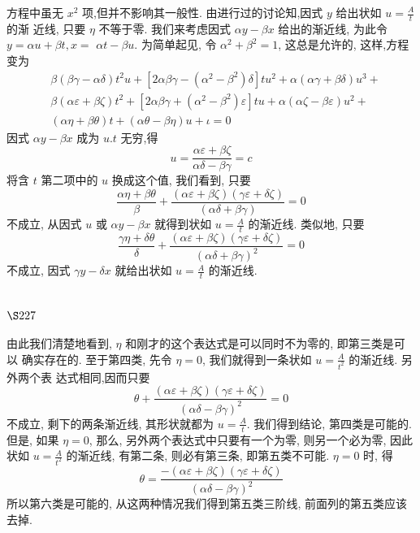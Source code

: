 方程中虽无 $x^{2}$ 项,但并不影响其一般性. 由进行过的讨论知,因式 $y$ 给出状如 $u=\frac{A}{t}$ 的渐 近线, 只要 $\eta$ 不等于零. 我们来考虑因式 $\alpha y-\beta x$ 给出的渐近线, 为此令 $y=\alpha u+\beta t, x=$ $\alpha t-\beta u$. 为简单起见, 令 $\alpha^{2}+\beta^{2}=1$, 这总是允许的, 这样,方程变为
\[
\begin{aligned}
& \beta(\beta \gamma-\alpha \delta) t^{2} u+\left[2 \alpha \beta \gamma-\left(\alpha^{2}-\beta^{2}\right) \delta\right] t u^{2}+\alpha(\alpha \gamma+\beta \delta) u^{3}+ \\
& \beta(\alpha \varepsilon+\beta \zeta) t^{2}+\left[2 \alpha \beta \gamma+\left(\alpha^{2}-\beta^{2}\right) \varepsilon\right] t u+\alpha(\alpha \zeta-\beta \varepsilon) u^{2}+ \\
& (\alpha \eta+\beta \theta) t+(\alpha \theta-\beta \eta) u+\iota=0
\end{aligned}
\]
因式 $\alpha y-\beta x$ 成为 $u . t$ 无穷,得
\[
u=\frac{\alpha \varepsilon+\beta \zeta}{\alpha \delta-\beta \gamma}=c
\]
将含 $t$ 第二项中的 $u$ 换成这个值, 我们看到, 只要
\[
\frac{\alpha \eta+\beta \theta}{\beta}+\frac{(\alpha \varepsilon+\beta \zeta)(\gamma \varepsilon+\delta \zeta)}{(\alpha \delta+\beta \gamma)}=0
\]
不成立, 从因式 $u$ 或 $\alpha y-\beta x$ 就得到状如 $u=\frac{A}{t}$ 的渐近线. 类似地, 只要
\[
\frac{\gamma \eta+\delta \theta}{\delta}+\frac{(\alpha \varepsilon+\beta \zeta)(\gamma \varepsilon+\delta \zeta)}{(\alpha \delta+\beta \gamma)^{2}}=0
\]
不成立, 因式 $\gamma y-\delta x$ 就给出状如 $u=\frac{A}{t}$ 的渐近线.

\section{$\S 227$}

由此我们清楚地看到, $\eta$ 和刚才的这个表达式是可以同时不为零的, 即第三类是可以 确实存在的. 至于第四类, 先令 $\eta=0$, 我们就得到一条状如 $u=\frac{A}{t^{2}}$ 的渐近线. 另外两个表 达式相同,因而只要
\[
\theta+\frac{(\alpha \varepsilon+\beta \zeta)(\gamma \varepsilon+\delta \zeta)}{(\alpha \delta-\beta \gamma)^{2}}=0
\]
不成立, 剩下的两条渐近线, 其形状就都为 $u=\frac{A}{t}$. 我们得到结论, 第四类是可能的. 但是, 如果 $\eta=0$, 那么, 另外两个表达式中只要有一个为零, 则另一个必为零, 因此状如 $u=\frac{A}{t^{2}}$ 的渐近线, 有第二条, 则必有第三条, 即第五类不可能. $\eta=0$ 时, 得
\[
\theta=\frac{-(\alpha \varepsilon+\beta \zeta)(\gamma \varepsilon+\delta \zeta)}{(\alpha \delta-\beta \gamma)^{2}}
\]
所以第六类是可能的, 从这两种情况我们得到第五类三阶线, 前面列的第五类应该去掉.

